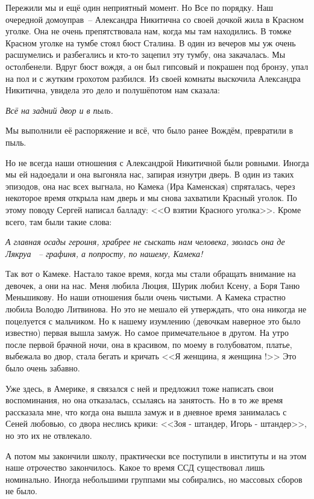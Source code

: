 Пережили мы и ещё один неприятный момент. Но Все по порядку. Наш очередной домоуправ~-- Александра Никитична со своей дочкой жила в Красном уголке. Она не очень препятствовала нам, когда мы там находились. В томже Красном уголке на тумбе стоял бюст Сталина. В один из вечеров мы уж очень расшумелись и разбегались и кто-то зацепил эту тумбу, она закачалась. Мы остолбенели. Вдруг бюст вождя, а он был гипсовый и покрашен под бронзу, упал на пол и с жутким грохотом разбился. Из своей комнаты выскочила Александра Никитична, увидела это дело и полушёпотом нам сказала:

\textit{Всё на задний двор и в пыль.}

Мы выполнили её распоряжение и всё, что было ранее Вождём, превратили в пыль.

Но не всегда наши отношения с Александрой Никитичной были ровными. Иногда мы ей надоедали и она выгоняла нас, запирая изнутри дверь. В один из таких эпизодов, она нас всех выгнала, но Камека (Ира Каменская) спряталась, через некоторое время открыла нам дверь и мы снова захватили Красный уголок. По этому поводу Сергей написал балладу: <<О взятии Красного уголка>>. Кроме всего, там были такие слова:

\indent

{\itshape
А главная осады героиня, храбрее не сыскать нам человека, зволась она де Лякруа ~-- графиня, а попросту, по нашему, Камека!
}

\indent

Так вот о Камеке. Настало такое время, когда мы стали обращать внимание на девочек, а они на нас. Меня любила Люция, Шурик любил Ксену, а Боря Таню Меньшикову. Но наши отношения были очень чистыми. А Камека страстно любила Володю Литвинова. Но это не мешало ей утверждать, что она никогда не поцелуется с мальчиком. Но к нашему изумлению (девочкам наверное это было известно) первая вышла замуж. Но самое примечательное в другом. На утро после первой брачной ночи, она в красивом, по моему в голубоватом, платье, выбежала во двор, стала бегать и кричать <<Я женщина, я женщина !>> Это было очень забавно.

Уже здесь, в Америке, я связался с ней и предложил тоже написать свои воспоминания, но она отказалась, ссылаясь на занятость. Но в то же время рассказала мне, что когда она вышла замуж и в дневное время занималась с Сеней любовью, со двора неслись крики: <<Зоя - штандер, Игорь - штандер>>, но это их не отвлекало.

А потом мы закончили школу, практически все поступили в институты и на этом наше отрочество закончилось.
Какое то время ССД существовал лишь номинально. Иногда небольшими группами мы собирались, но массовых сборов не было.

